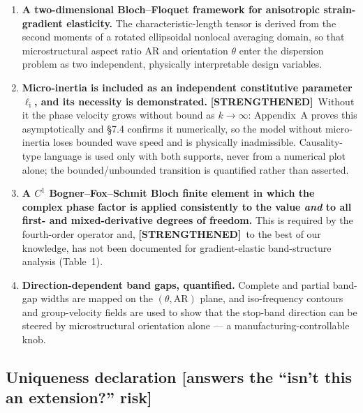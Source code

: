\documentclass[11pt,a4paper]{article}
\newcommand{\bp}[1]{\textcolor{accent}{\textsf{\footnotesize [#1]}}}
\newcommand{\STR}{{\color{strcol}\textbf{[STRENGTHENED]}}}
\begin{document}
\begin{enumerate}[label=\textbf{C\arabic*.}]
\item \textbf{A two-dimensional Bloch--Floquet framework for anisotropic strain-gradient
elasticity.} The characteristic-length tensor is derived from the second moments of a
rotated ellipsoidal nonlocal averaging domain, so that microstructural aspect ratio
$\mathrm{AR}$ and orientation $\theta$ enter the dispersion problem as two independent,
physically interpretable design variables.

\item \textbf{Micro-inertia is included as an independent constitutive parameter
$\ell_{\mathrm{i}}$, and its necessity is demonstrated.} \STR\ Without it the phase velocity
grows without bound as $k\to\infty$: Appendix~A proves this asymptotically and \S7.4 confirms it numerically, so the model without micro-inertia loses bounded wave speed and is physically inadmissible. Causality-type language is used only with both supports, never from a numerical plot alone; the bounded/unbounded transition is quantified rather than asserted.

\item \textbf{A $C^1$ Bogner--Fox--Schmit Bloch finite element in which the complex
phase factor is applied consistently to the value \emph{and} to all first- and
mixed-derivative degrees of freedom.} This is required by the fourth-order operator
and, \STR\ to the best of our knowledge, has not been documented for gradient-elastic band-structure analysis (Table~1).

\item \textbf{Direction-dependent band gaps, quantified.} Complete and partial band-gap
widths are mapped on the $(\theta,\mathrm{AR})$ plane, and iso-frequency contours and
group-velocity fields are used to show that the stop-band direction can be steered by
microstructural orientation alone --- a manufacturing-controllable knob.
\end{enumerate}

\subsection{Uniqueness declaration \bp{answers the ``isn't this an extension?'' risk}}
\end{document}
